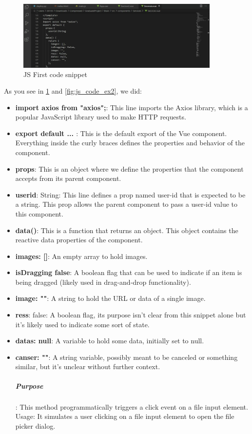 \begin{figure}
 \centering
    \includegraphics[width=0.90\textwidth]{Img/Chap-01/37.jpg}
    \caption{JS First code snippet}
    \label{fig:js_code_ex}
\end{figure}

As you see in \ref{fig:js_code_ex} and \ref{fig:js_code_ex2}, we did:

\begin{itemize}
    \item \textbf{import axios from "axios";}: This line imports the Axios library, which is a popular JavaScript library used to make HTTP requests.
    \item \textbf{export default { ... }}: This is the default export of the Vue component. Everything inside the curly braces defines the properties and behavior of the component.
    \item \textbf{props}: This is an object where we define the properties that the component accepts from its parent component.
    \item \textbf{userid}: String: This line defines a prop named user-id that is expected to be a string. This prop allows the parent component to pass a user-id value to this component.
    \item \textbf{data()}: This is a function that returns an object. This object contains the reactive data properties of the component.
    \item \textbf{images: []}: An empty array to hold images.
    \item \textbf{isDragging false}: A boolean flag that can be used to indicate if an item is being dragged (likely used in drag-and-drop functionality).
    \item \textbf{image: ""}: A string to hold the URL or data of a single image.
    \item \textbf{ress}: false: A boolean flag, its purpose isn't clear from this snippet alone but it's likely used to indicate some sort of state.
    \item \textbf{datas: null}: A variable to hold some data, initially set to null.
    \item \textbf{canser: ""}: A string variable, possibly meant to be canceled or something similar, but it's unclear without further context.
    \subparagraph{Purpose}: This method programmatically triggers a click event on a file input element.
Usage: It simulates a user clicking on a file input element to open the file picker dialog.
\end{itemize}

